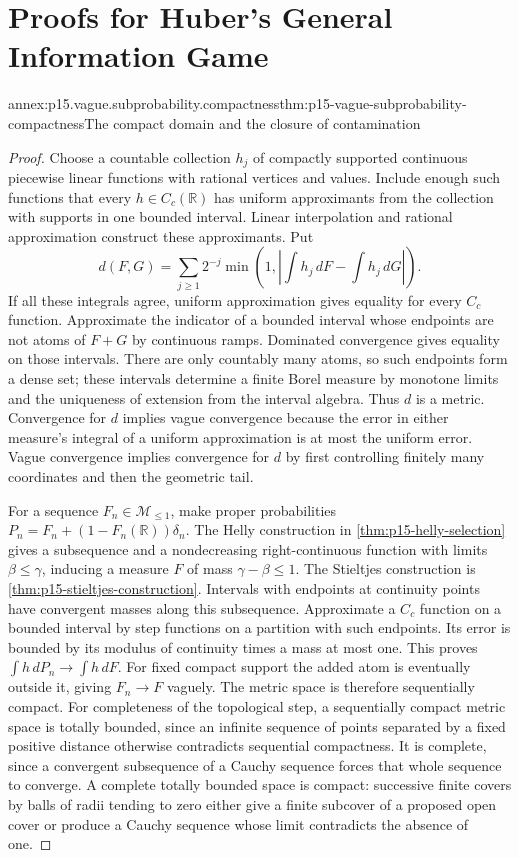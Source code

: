 \chapter{Proofs for Huber's General Information Game}
\label{annex:p15-huber-information-game}

\begin{annexitem}{annex:p15.vague.subprobability.compactness}{thm:p15-vague-subprobability-compactness}{The compact domain and the closure of contamination}
\begin{proof}
Choose a countable collection \(h_j\) of compactly supported continuous
piecewise linear functions with rational vertices and values. Include
enough such functions that every \(h\in C_c(\mathbb R)\) has uniform
approximants from the collection with supports in one bounded interval.
Linear interpolation and rational approximation construct these
approximants. Put
\[
 d(F,G)=\sum_{j\geq1}2^{-j}
       \min\left(1,\left|\int h_j\,dF-\int h_j\,dG\right|\right).
\]
If all these integrals agree, uniform approximation gives equality
for every \(C_c\) function. Approximate the indicator of a bounded
interval whose endpoints are not atoms of \(F+G\) by continuous ramps.
Dominated convergence gives equality on those intervals. There are
only countably many atoms, so such endpoints form a dense set; these
intervals determine a finite Borel measure by monotone limits and
the uniqueness of extension from the interval algebra. Thus \(d\)
is a metric. Convergence for \(d\) implies vague convergence because
the error in either measure's integral of a uniform approximation
is at most the uniform error. Vague convergence implies convergence
for \(d\) by first controlling finitely many coordinates and then
the geometric tail.

For a sequence \(F_n\in\mathcal M_{\leq1}\), make proper probabilities
\(P_n=F_n+(1-F_n(\mathbb R))\delta_n\). The Helly construction in
\cref{thm:p15-helly-selection} gives a subsequence and a nondecreasing
right-continuous function with limits \(\beta\leq\gamma\), inducing a
measure \(F\) of mass \(\gamma-\beta\leq1\). The Stieltjes construction
is \cref{thm:p15-stieltjes-construction}. Intervals with endpoints
at continuity points have convergent masses along this subsequence.
Approximate a \(C_c\) function on a bounded interval by step functions
on a partition with such endpoints. Its error is bounded by its
modulus of continuity times a mass at most one. This proves
\(\int h\,dP_n\to\int h\,dF\). For fixed compact support the added
atom is eventually outside it, giving \(F_n\to F\) vaguely.
The metric space is therefore sequentially compact. For completeness
of the topological step, a sequentially compact metric space is totally
bounded, since an infinite sequence of points separated by a fixed
positive distance otherwise contradicts sequential compactness.
It is complete, since a convergent subsequence of a Cauchy sequence
forces that whole sequence to converge. A complete totally bounded
space is compact: successive finite covers by balls of radii tending
to zero either give a finite subcover of a proposed open cover or
produce a Cauchy sequence whose limit contradicts the absence of one.


\end{proof}
\end{annexitem}
